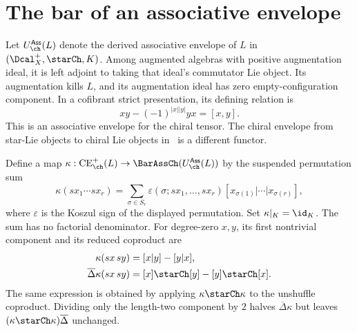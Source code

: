 \section{The bar of an associative envelope}
Let $U_{\ch}^{\mathsf{Ass}}(L)$ denote the derived associative envelope of $L$ in $(\Dcal_X^+,\starCh,K)$. Among augmented algebras with positive augmentation ideal, it is left adjoint to taking that ideal's commutator Lie object. Its augmentation kills $L$, and its augmentation ideal has zero empty-configuration component. In a cofibrant strict presentation, its defining relation is
\[
 xy-(-1)^{|x||y|}yx=[x,y].
\]
This is an associative envelope for the chiral tensor. The chiral envelope from star-Lie objects to chiral Lie objects in~\cite[\S6]{FG12} is a different functor.

Define a map $\kappa:\operatorname{CE}_{\ch}^+(L)\to\BarAssCh(U_{\ch}^{\mathsf{Ass}}(L))$ by the suspended permutation sum
\begin{equation}\label{cbc:bars:pbw-map}
 \kappa(sx_1\cdots sx_r)
 =\sum_{\sigma\in S_r}
   \varepsilon(\sigma;sx_1,\ldots,sx_r)
   [x_{\sigma(1)}|\cdots|x_{\sigma(r)}],
\end{equation}
where $\varepsilon$ is the Koszul sign of the displayed permutation. Set $\kappa|_K=\id_K$. The sum has no factorial denominator. For degree-zero $x,y$, its first nontrivial component and its reduced coproduct are
\begin{align*}
 \kappa(sx\,sy)&=[x|y]-[y|x],\\
 \overline\Delta\kappa(sx\,sy)&=[x]\starCh[y]-[y]\starCh[x].
\end{align*}
The same expression is obtained by applying $\kappa\starCh\kappa$ to the unshuffle coproduct. Dividing only the length-two component by $2$ halves $\overline\Delta\kappa$ but leaves $(\kappa\starCh\kappa)\overline\Delta$ unchanged.

